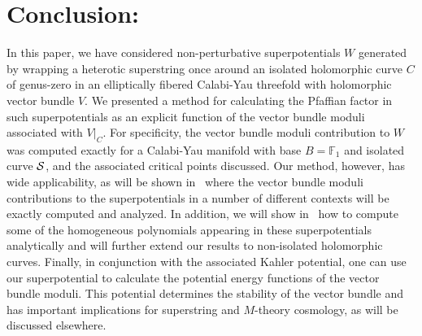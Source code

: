 \documentclass[a4paper,12pt]{article}
\numberwithin{equation}{section}
\theoremstyle{plain}
\begin{document}

\section{Conclusion:}


In this paper, we have considered non-perturbative superpotentials $W$
generated by wrapping a heterotic superstring once around an isolated
holomorphic curve $C$ of genus-zero in an elliptically fibered Calabi-Yau
threefold with holomorphic vector bundle $V$. We presented a method for
calculating the Pfaffian factor in such superpotentials as an explicit
function of the vector bundle moduli associated with $V|_{C}$. For
specificity, the vector bundle moduli contribution to $W$ was computed
exactly
for a Calabi-Yau manifold with base $B={\mathbb F}_{1}$ and isolated curve
${\cal{S}}$, and the associated critical points discussed. Our method,
however, has wide applicability, as will be shown in~\cite{BDOnew} where
the
vector bundle moduli contributions to the superpotentials in a number of
different contexts will be exactly computed and analyzed. In addition, we
will
show in~\cite{BDOnew} how to compute some of the homogeneous polynomials
appearing in these superpotentials analytically and will further extend
our
results to non-isolated holomorphic curves. Finally, in conjunction with
the
associated Kahler potential, one can use our superpotential to calculate
the potential energy functions of the vector bundle moduli. This potential
determines the stability of the vector bundle and has important
implications
for superstring and $M$-theory cosmology, as will be discussed elsewhere.



\end{document}
